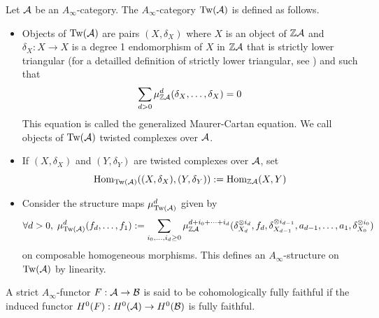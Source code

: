 \documentclass[12pt]{article}
\begin{document}
	\begin{definition}
		Let ${\cal{A}}$ be an $A_\infty$-category. The $A_\infty$-category $\textup{Tw}({\cal{A}})$ is defined as follows.
		\begin{itemize}
			\item Objects of $\textup{Tw}({\cal{A}})$ are pairs $(X,\delta_X)$ where $X$ is an object of $\mathbb{Z} {\cal{A}}$ and $\delta_X: X \to X$ is a degree 1 endomorphism of $X$ in $\mathbb{Z} {\cal{A}}$ that is strictly lower triangular (for a detailled definition of strictly lower triangular, see \cite[Section 3l]{Sei}) and such that
			\begin{equation} 
			\sum_{d>0} \mu_{\mathbb{Z} {\cal{A}}}^d(\delta_X,\dots, \delta_X) = 0
			\end{equation}
			This equation is called the generalized Maurer-Cartan equation. We call objects of $\textup{Tw}({\cal{A}})$ twisted complexes over ${\cal{A}}$.
			\item If $(X,\delta_X)$ and $(Y,\delta_Y)$ are twisted complexes over ${\cal{A}}$, set
			\[\textup{Hom}_{\textup{Tw}({\cal{A}})}((X,\delta_X),(Y,\delta_Y)):= \textup{Hom}_{\mathbb{Z} {\cal{A}}}(X,Y)\]
			\item Consider the structure maps $\mu^d_{\textup{Tw}({\cal{A}})}$ given by
			\[\forall d >0, \;\mu_{\textup{Tw}({\cal{A}})}^d(f_d,\dots,f_1):= \sum_{i_0,\dots,i_d \geq 0} \mu_{\mathbb{Z} {\cal{A}}}^{d+i_0 + \dots + i_d}(\delta_{X_d}^{\otimes i_d},f_d,\delta_{X_{d-1}}^{\otimes i_{d-1}},a_{d-1},\dots,a_1,\delta_{X_0}^{\otimes i_0})\]
			on composable homogeneous morphisms. This defines an $A_\infty$-structure on $\textup{Tw}({\cal{A}})$ by linearity.
		\end{itemize}
	\end{definition}
	
	\begin{definition}
		A strict $A_\infty$-functor $F: {\cal{A}} \to {\cal{B}}$ is said to be cohomologically fully faithful if the induced functor $H^0(F): H^0({\cal{A}}) \to H^0({\cal{B}})$ is fully faithful.
	\end{definition}
	
\end{document}
